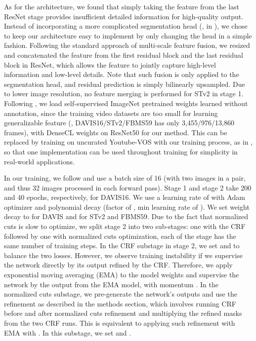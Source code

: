 As for the architecture, we found that simply taking the feature from the last ResNet stage provides insufficient detailed information for high-quality output. Instead of incorporating a more complicated segmentation head (\eg, \cite{cheng2021maskformer} in \cite{choudhury2022guess}), we chose to keep our architecture easy to implement by only changing the head in a simple fashion. Following the standard approach of multi-scale feature fusion, we resized and concatenated the feature from the first residual block and the last residual block in ResNet, which allows the feature to jointly capture high-level information and low-level details. Note that such fusion is only applied to the segmentation head, and residual prediction is simply bilinearly upsampled. Due to lower image resolution, no feature merging is performed for STv2 in stage 1. Following \cite{choudhury2022guess}, we load self-supervised ImageNet pretrained weights learned without annotation, since the training video datasets are too small for learning generalizable feature (\eg, DAVIS16/STv2/FBMS59 has only 3,455/976/13,860 frames), with DenseCL weights \cite{ILSVRC15,wang2021dense} on ResNet50 for our method. This can be replaced by training on uncurated Youtube-VOS \cite{xu2018youtube} with our training process, as in \cite{liu2021emergence}, so that one implementation can be used throughout training for simplicity in real-world applications.

In our training, we follow \cite{liu2021emergence} and use a batch size of 16 (with two images in a pair, and thus 32 images processed in each forward pass). Stage 1 and stage 2 take 200 and 40 epochs, respectively, for DAVIS16. We use a learning rate of  with Adam optimizer \cite{kingma2014adam} and polynomial decay (factor of , min learning rate of ). We set weight decay to  for DAVIS and  for STv2 and FBMS59. Due to the fact that normalized cuts is slow to optimize, we split stage 2 into two sub-stages: one with the CRF followed by one with normalized cuts optimization, each of the stage has the same number of training steps. In the CRF substage in stage 2, we set  and  to balance the two losses. However, we observe training instability if we supervise the network directly by its output refined by the CRF. Therefore, we apply exponential moving averaging (EMA) to the model weights and supervise the network by the output from the EMA model, with momentum . In the normalized cuts substage, we pre-generate the network's outputs and use the refinement as described in the methods section, which involves running CRF before and after normalized cuts refinement and multiplying the refined masks from the two CRF runs. This is equivalent to applying such refinement with EMA with . In this substage, we set  and .

